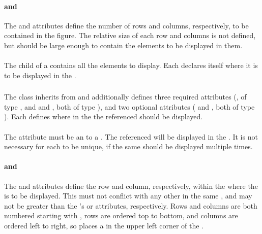 \begin{blockChanged}

\paragraph*{ and }
The  and  attributes define the number of rows and columns, respectively, to be contained in the figure.  The relative size of each row and columns is not defined, but should be large enough to contain the \Plot elements to be displayed in them.

\paragraph*{}
The  child of a \Figure contains all the \Plot elements to display.  Each \SubPlot declares itself where it is to be displayed in the \Figure.


\subsubsection{}
\label{class:subPlot}

The \SubPlot class inherits from \SedBase and additionally defines three required attributes (, of type \SIdRef, and  and , both of type ), and two optional attributes ( and , both of type ).  Each \SubPlot defines where in the \Figure the referenced \Plot should be displayed.

\paragraph*{}
The  attribute must be an \SIdRef to a \Plot.  The referenced \Plot will be displayed in the \Figure.  It is not necessary for each  to be unique, if the same \Plot should be displayed multiple times.

\paragraph*{ and }
The  and  attributes define the row and column, respectively, within the \Figure where the \Plot is to be displayed.  This must not conflict with any other \SubPlot in the same \Figure, and may not be greater than the \Figure's  or  attributes, respectively.  Rows and columns are both numbered starting with , rows are ordered top to bottom, and columns are ordered left to right, so  places a \Plot in the upper left corner of the \Figure.


\end{blockChanged}
